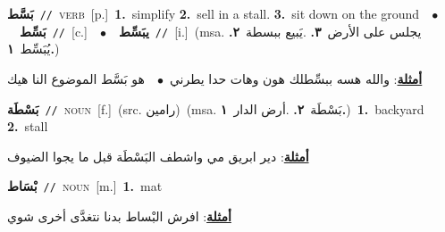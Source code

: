 \documentclass[10pt,a4paper,twoside]{article} %
\begin{document}
\begin{multicols}{2}
{\setlength\topsep{0pt}\textbf{\foreignlanguage{arabic}{بَسَّط}}\ {\color{gray}\texttt{//}\color{black}}\ \textsc{verb}\ [p.]\ \textbf{1.}~simplify  \textbf{2.}~sell in a stall.  \textbf{3.}~sit down on the ground\ \ $\bullet$\ \ \setlength\topsep{0pt}\textbf{\foreignlanguage{arabic}{بَسِّط}}\ {\color{gray}\texttt{//}\color{black}}\ [c.]\ \ $\bullet$\ \ \setlength\topsep{0pt}\textbf{\foreignlanguage{arabic}{يبَسِّط}}\ {\color{gray}\texttt{//}\color{black}}\ [i.]\ \color{gray}(msa. \foreignlanguage{arabic}{يجلس على الأرض}~\foreignlanguage{arabic}{\textbf{٣.}}  .\foreignlanguage{arabic}{يَبيع ببسطة}~\foreignlanguage{arabic}{\textbf{٢.}}  \foreignlanguage{arabic}{يُبَسِّط}~\foreignlanguage{arabic}{\textbf{١.}})\color{black}\  \begin{flushright}\color{gray}\foreignlanguage{arabic}{\textbf{\underline{\foreignlanguage{arabic}{أمثلة}}}: والله هسه ببسِّطلك هون وهات حدا يطرني\ $\bullet$\ \  هو بَسَّط الموضوع النا هيك}\end{flushright}\color{black}} \vspace{2mm}

{\setlength\topsep{0pt}\textbf{\foreignlanguage{arabic}{بَسْطَة}}\ {\color{gray}\texttt{//}\color{black}}\ \textsc{noun}\ [f.]\ (src. \color{gray}\foreignlanguage{arabic}{رامين}\color{black})\ \color{gray}(msa. \foreignlanguage{arabic}{بَسْطَة}~\foreignlanguage{arabic}{\textbf{٢.}}  .\foreignlanguage{arabic}{أرض الدار}~\foreignlanguage{arabic}{\textbf{١.}})\color{black}\ \textbf{1.}~backyard  \textbf{2.}~stall\  \begin{flushright}\color{gray}\foreignlanguage{arabic}{\textbf{\underline{\foreignlanguage{arabic}{أمثلة}}}: دير ابريق مي واشطف البَسْطَة قبل ما يجوا الضيوف}\end{flushright}\color{black}} \vspace{2mm}

{\setlength\topsep{0pt}\textbf{\foreignlanguage{arabic}{بْسَاط}}\ {\color{gray}\texttt{//}\color{black}}\ \textsc{noun}\ [m.]\ \textbf{1.}~mat\  \begin{flushright}\color{gray}\foreignlanguage{arabic}{\textbf{\underline{\foreignlanguage{arabic}{أمثلة}}}: افرش البْساط بدنا نتغدَّى أخرى شوي}\end{flushright}\color{black}} \vspace{2mm}


\end{multicols}
\end{document}
